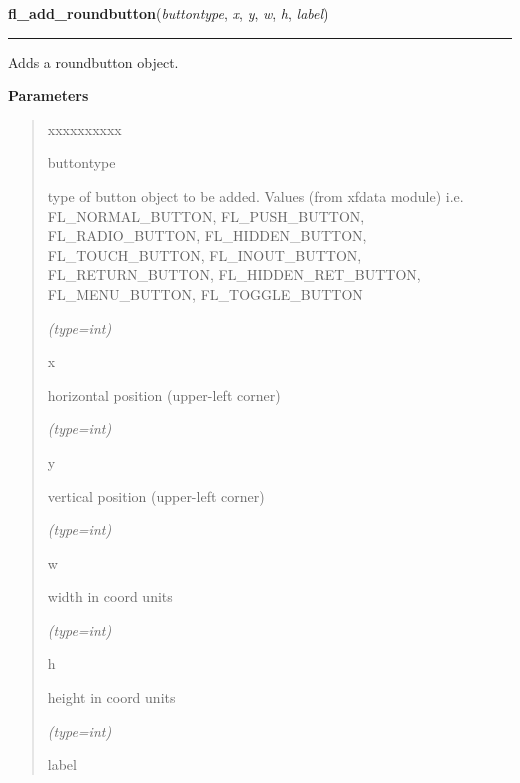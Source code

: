     \vspace{0.5ex}

\hspace{.8\funcindent}\begin{boxedminipage}{\funcwidth}

    \raggedright \textbf{fl\_add\_roundbutton}(\textit{buttontype}, \textit{x}, \textit{y}, \textit{w}, \textit{h}, \textit{label})

    \vspace{-1.5ex}

    \rule{\textwidth}{0.5\fboxrule}
\setlength{\parskip}{2ex}
    Adds a roundbutton object.

\setlength{\parskip}{1ex}
      \textbf{Parameters}
      \vspace{-1ex}

      \begin{quote}
        \begin{Ventry}{xxxxxxxxxx}

          \item[buttontype]

          type of button object to be added. Values (from xfdata module) 
          i.e. FL\_NORMAL\_BUTTON, FL\_PUSH\_BUTTON, FL\_RADIO\_BUTTON, 
          FL\_HIDDEN\_BUTTON, FL\_TOUCH\_BUTTON, FL\_INOUT\_BUTTON, 
          FL\_RETURN\_BUTTON, FL\_HIDDEN\_RET\_BUTTON, FL\_MENU\_BUTTON, 
          FL\_TOGGLE\_BUTTON

            {\it (type=int)}

          \item[x]

          horizontal position (upper-left corner)

            {\it (type=int)}

          \item[y]

          vertical position (upper-left corner)

            {\it (type=int)}

          \item[w]

          width in coord units

            {\it (type=int)}

          \item[h]

          height in coord units

            {\it (type=int)}

          \item[label]


\end{Ventry}
\end{quote}
\end{boxedminipage}
